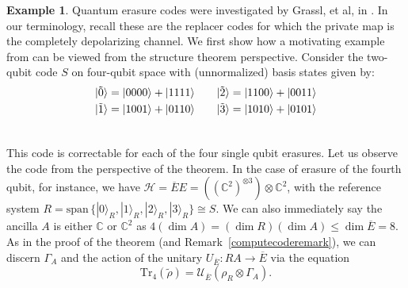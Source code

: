 \documentclass[11pt]{amsart}
\theoremstyle{definition}
\newtheorem{example}[thm]{Example}
\theoremstyle{definition}
\theoremstyle{definition}
\newcommand{\tr}{\textrm{Tr}}
\newcommand{\1}{\mathbb{I}}
\def\ket#1{| #1 \rangle}
\begin{document}
\begin{example}\label{ex:grassl-four-qubit}
Quantum erasure codes were investigated by Grassl, et al, in \cite{grassl1997codes}. In our terminology, recall these are the replacer codes for which the private map is the completely depolarizing channel. We first show how a motivating example from \cite{grassl1997codes} can be viewed from the structure theorem perspective. Consider the two-qubit code $S$ on four-qubit space with (unnormalized) basis states given by: 
    \begin{align}
        \ket{\tilde{0}} = \ket{0000}+\ket{1111} &  \quad \quad      \ket{\tilde{2}} = \ket{1100}+\ket{0011} \notag \\
       \ket{\tilde{1}} = \ket{1001}+\ket{0110}  & \quad \quad  \ket{\tilde{3}} = \ket{1010}+\ket{0101} \notag \\
       \notag
    \end{align}  
    
This code is correctable for each of the four single qubit erasures. Let us observe the code from the perspective of the theorem. In the case of erasure of the fourth qubit, for instance, we have $\mathcal H = \overline{E} E = ( (\mathbb C^2)^{\otimes 3} ) \otimes \mathbb C^2$, with the reference system $R = \mathrm{span} \, \{ \ket{0}_R, \ket{1}_R, \ket{2}_R, \ket{3}_R  \} \cong S$. We can also immediately say the ancilla $A$ is either $\mathbb C$ or $\mathbb C^2$ as $4 (\dim A) = (\dim R) (\dim A) \leq \dim \overline{E} =8$. As in the proof of the theorem (and Remark~\ref{computecoderemark}), we can discern $\Gamma_A$ and the action of the unitary $U_{\overline{E}}: RA \rightarrow \overline{E}$ via the equation 
\[
\tr_4 (\widetilde{\rho}) = \mathcal U_{\overline{E}} (\rho_R \otimes \Gamma_A).  
\]


\end{example}
\end{document}
